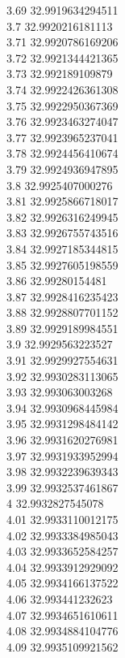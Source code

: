 {3.69	32.9919634294511\\
3.7	32.9920216181113\\
3.71	32.9920786169206\\
3.72	32.9921344421365\\
3.73	32.992189109879\\
3.74	32.9922426361308\\
3.75	32.9922950367369\\
3.76	32.9923463274047\\
3.77	32.9923965237041\\
3.78	32.9924456410674\\
3.79	32.9924936947895\\
3.8	32.9925407000276\\
3.81	32.9925866718017\\
3.82	32.9926316249945\\
3.83	32.9926755743516\\
3.84	32.9927185344815\\
3.85	32.9927605198559\\
3.86	32.99280154481\\
3.87	32.9928416235423\\
3.88	32.9928807701152\\
3.89	32.9929189984551\\
3.9	32.9929563223527\\
3.91	32.9929927554631\\
3.92	32.9930283113065\\
3.93	32.993063003268\\
3.94	32.9930968445984\\
3.95	32.9931298484142\\
3.96	32.9931620276981\\
3.97	32.9931933952994\\
3.98	32.9932239639343\\
3.99	32.9932537461867\\
4	32.9932827545078\\
4.01	32.9933110012175\\
4.02	32.9933384985043\\
4.03	32.9933652584257\\
4.04	32.9933912929092\\
4.05	32.9934166137522\\
4.06	32.993441232623\\
4.07	32.9934651610611\\
4.08	32.9934884104776\\
4.09	32.9935109921562\\
}

